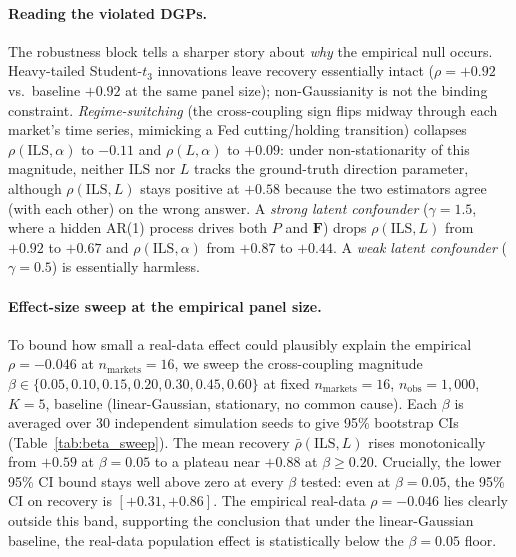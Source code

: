 \documentclass{article}
\begin{document}
\paragraph{Reading the violated DGPs.}
The robustness block tells a sharper story about \emph{why} the empirical null occurs. Heavy-tailed Student-$t_3$ innovations leave recovery essentially intact ($\rho = +0.92$ vs.\ baseline $+0.92$ at the same panel size); non-Gaussianity is not the binding constraint. \emph{Regime-switching} (the cross-coupling sign flips midway through each market's time series, mimicking a Fed cutting/holding transition) collapses $\rho(\mathrm{ILS}, \alpha)$ to $-0.11$ and $\rho(L, \alpha)$ to $+0.09$: under non-stationarity of this magnitude, neither $\mathrm{ILS}$ nor $L$ tracks the ground-truth direction parameter, although $\rho(\mathrm{ILS}, L)$ stays positive at $+0.58$ because the two estimators agree (with each other) on the wrong answer. A \emph{strong latent confounder} ($\gamma = 1.5$, where a hidden AR(1) process drives both $P$ and $\mathbf{F}$) drops $\rho(\mathrm{ILS}, L)$ from $+0.92$ to $+0.67$ and $\rho(\mathrm{ILS}, \alpha)$ from $+0.87$ to $+0.44$. A \emph{weak latent confounder} ($\gamma = 0.5$) is essentially harmless.

\paragraph{Effect-size sweep at the empirical panel size.}
To bound how small a real-data effect could plausibly explain the empirical $\rho = -0.046$ at $n_\text{markets} = 16$, we sweep the cross-coupling magnitude $\beta \in \{0.05, 0.10, 0.15, 0.20, 0.30, 0.45, 0.60\}$ at fixed $n_\text{markets} = 16$, $n_\text{obs} = 1{,}000$, $K = 5$, baseline (linear-Gaussian, stationary, no common cause). Each $\beta$ is averaged over $30$ independent simulation seeds to give 95\% bootstrap CIs (Table~\ref{tab:beta_sweep}). The mean recovery $\bar\rho(\mathrm{ILS}, L)$ rises monotonically from $+0.59$ at $\beta = 0.05$ to a plateau near $+0.88$ at $\beta \ge 0.20$. Crucially, the lower 95\% CI bound stays well above zero at every $\beta$ tested: even at $\beta = 0.05$, the 95\% CI on recovery is $[+0.31, +0.86]$. The empirical real-data $\rho = -0.046$ lies clearly outside this band, supporting the conclusion that under the linear-Gaussian baseline, the real-data population effect is statistically below the $\beta = 0.05$ floor.
\end{document}
